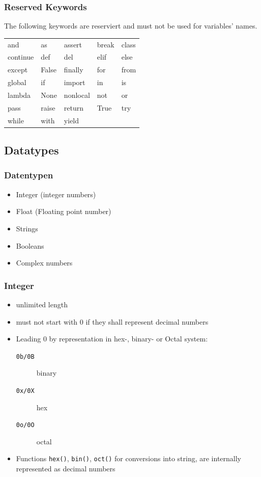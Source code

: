 \documentclass[ngerman]{beamer}
\begin{document}
\begin{frame}
\frametitle{Reserved Keywords}

The following  keywords are reserviert and must not be used for variables' names.

\begin{center}
\begin{tabular}{p{}p{}p{}p{}p{}}
and	&	as	&	assert	&	break	&	class	\\
continue	&	def	&	del	&	elif	&	else	\\
except	&	False	&	finally	&	for	&	from	\\
global	&	if	&	import	&	in	&	is	\\
lambda	&	None	&	nonlocal	&	not	&	or	\\
pass	&	raise	&	return	&	True	&	try	\\
while	&	with	&	yield	&		&		\\
\end{tabular}
\end{center}
\end{frame}



\subsection{Datatypes}

\begin{frame}
\frametitle{Datentypen}


\begin{itemize}
\item Integer (integer numbers)
\item Float (Floating point number)
\item Strings
\item Booleans
\item Complex numbers
\end{itemize}
\end{frame}

\begin{frame}
\frametitle{Integer}

\begin{itemize}
\item unlimited length
\item must not start with 0 if they shall represent decimal numbers 
\item Leading 0 by representation in hex-, binary- or Octal system:
\begin{description}
\item[\texttt{0b/0B}] binary
\item[\texttt{0x/0X}] hex
\item[\texttt{0o/0O}] octal
\end{description}
\item Functions \texttt{hex()}, \texttt{bin()}, \texttt{oct()} for conversions into string, are internally represented as decimal numbers 
\end{itemize}
\end{frame}
\end{document}
